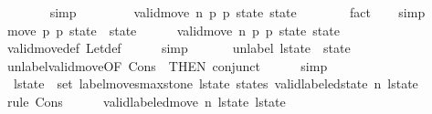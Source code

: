 \begin{isabellebody}
\ \ \ \ \ \ \isamarkupfalse%
\ simp\isanewline
\ \ \isamarkupfalse%
\isanewline
\ \ \ \ \isamarkupfalse%
\ {\isachardoublequoteopen}valid{\isacharunderscore}move{\isacharprime}\ n\ {\isacharquery}p{}\ {\isacharquery}p{}\ {\isacharquery}state\ state{\isacharprime}{\isachardoublequoteclose}\isanewline
\ \ \ \ \ \ \isamarkupfalse%
\ fact\isanewline
\ \ \isamarkupfalse%
\ simp\isanewline
\isanewline
\ \ \isamarkupfalse%
\ {\isachardoublequoteopen}move\ {\isacharquery}p{}\ {\isacharquery}p{}\ {\isacharquery}state\ {\isacharequal}\ state{\isacharprime}{\isachardoublequoteclose}\isanewline
\ \ \ \ \isamarkupfalse%
\ {\isacharbackquoteopen}valid{\isacharunderscore}move{\isacharprime}\ n\ {\isacharquery}p{}\ {\isacharquery}p{}\ {\isacharquery}state\ state{\isacharprime}{\isacharbackquoteclose}\isanewline
\ \ \ \ \isamarkupfalse%
\ valid{\isacharunderscore}move{\isacharprime}{\isacharunderscore}def\ Let{\isacharunderscore}def\isanewline
\ \ \ \ \isamarkupfalse%
\ simp\isanewline
\ \ \isamarkupfalse%
\ \isamarkupfalse%
\ {\isacharasterisk}{\isacharcolon}\ {\isachardoublequoteopen}unlabel\ {\isacharquery}l{\isacharunderscore}state{\isacharprime}\ {\isacharequal}\ state{\isacharprime}{\isachardoublequoteclose}\isanewline
\ \ \ \ \isamarkupfalse%
\ unlabel{\isacharunderscore}valid{\isacharunderscore}move{\isacharprime}{\isacharbrackleft}OF\ Cons{\isacharparenleft}{}{\isacharparenright}\ {\isacharasterisk}{\isacharasterisk}{\isacharcomma}\ THEN\ conjunct{}{\isacharbrackright}\isanewline
\ \ \ \ \isamarkupfalse%
\ simp\isanewline
\ \ \ \ \isanewline
\ \ \isamarkupfalse%
\ {\isachardoublequoteopen}{\isasymforall}\ l{\isacharunderscore}state{\isacharprime}\ {\isasymin}\ set\ {\isacharparenleft}label{\isacharunderscore}moves{\isacharunderscore}max{\isacharunderscore}stone\ {\isacharquery}l{\isacharunderscore}state{\isacharprime}\ states{\isacharparenright}{\isachardot}\ valid{\isacharunderscore}labeled{\isacharunderscore}state\ n\ l{\isacharunderscore}state{\isacharprime}{\isachardoublequoteclose}\isanewline
\ \ \isamarkupfalse%
\ {\isacharparenleft}rule\ Cons{\isacharparenleft}{}{\isacharparenright}{\isacharparenright}\isanewline
\ \ \ \ \isamarkupfalse%
\ {\isachardoublequoteopen}valid{\isacharunderscore}labeled{\isacharunderscore}move\ n\ l{\isacharunderscore}state\ {\isacharquery}l{\isacharunderscore}state{\isacharprime}{\isachardoublequoteclose}\isanewline

\end{isabellebody}
